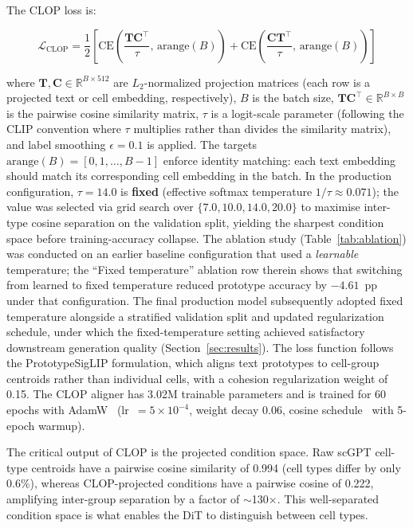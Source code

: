 \documentclass[genes,article,submit,pdftex,oneauthor]{Definitions/mdpi}
\begin{document}
The CLOP loss is:

\begin{linenomath}
\begin{equation}
\mathcal{L}_\text{CLOP} = \frac{1}{2}\left[\text{CE}\!\left(\frac{\mathbf{T}\mathbf{C}^\top}{\tau},\,\text{arange}(B)\right) + \text{CE}\!\left(\frac{\mathbf{C}\mathbf{T}^\top}{\tau},\,\text{arange}(B)\right)\right]
\label{eq:clop}
\end{equation}
\end{linenomath}

where $\mathbf{T}, \mathbf{C} \in \mathbb{R}^{B \times 512}$ are $L_2$-normalized projection matrices (each row is a projected text or cell embedding, respectively), $B$ is the batch size, $\mathbf{T}\mathbf{C}^\top \in \mathbb{R}^{B \times B}$ is the pairwise cosine similarity matrix, $\tau$ is a logit-scale parameter (following the CLIP convention where $\tau$ multiplies rather than divides the similarity matrix), and label smoothing $\epsilon = 0.1$ is applied. The targets $\text{arange}(B) = [0, 1, \ldots, B{-}1]$ enforce identity matching: each text embedding should match its corresponding cell embedding in the batch. In the production configuration, $\tau = 14.0$ is \textbf{fixed} (effective softmax temperature $1/\tau \approx 0.071$); the value was selected via grid search over $\{7.0, 10.0, 14.0, 20.0\}$ to maximise inter-type cosine separation on the validation split, yielding the sharpest condition space before training-accuracy collapse. The ablation study (Table~\ref{tab:ablation}) was conducted on an earlier baseline configuration that used a \emph{learnable} temperature; the ``Fixed temperature'' ablation row therein shows that switching from learned to fixed temperature reduced prototype accuracy by $-4.61$~pp under that configuration. The final production model subsequently adopted fixed temperature alongside a stratified validation split and updated regularization schedule, under which the fixed-temperature setting achieved satisfactory downstream generation quality (Section~\ref{sec:results}). The loss function follows the PrototypeSigLIP formulation, which aligns text prototypes to cell-group centroids rather than individual cells, with a cohesion regularization weight of 0.15. The CLOP aligner has 3.02M trainable parameters and is trained for 60 epochs with AdamW~\cite{ref-adamw} (lr~$= 5 \times 10^{-4}$, weight decay 0.06, cosine schedule~\cite{ref-cosine-schedule} with 5-epoch warmup).

The critical output of CLOP is the projected condition space. Raw scGPT cell-type centroids have a pairwise cosine similarity of 0.994 (cell types differ by only 0.6\%), whereas CLOP-projected conditions have a pairwise cosine of 0.222, amplifying inter-group separation by a factor of $\sim$130$\times$. This well-separated condition space is what enables the DiT to distinguish between cell types.
\end{document}
